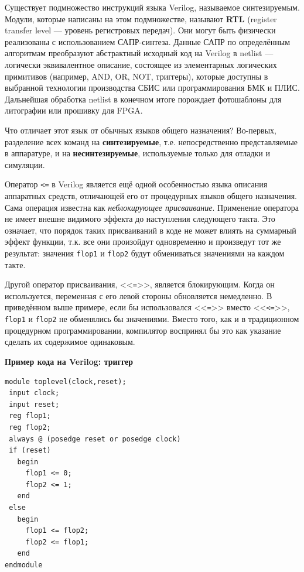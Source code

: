 Существует подмножество инструкций языка Verilog, называемое синтезируемым. Модули, которые написаны на этом подмножестве, называют \textbf{RTL} (\abbr register transfer level --- уровень регистровых передач). Они могут быть физически реализованы с использованием САПР-синтеза. Данные САПР по определённым алгоритмам преобразуют абстрактный исходный код на Verilog в netlist --- логически эквивалентное описание, состоящее из элементарных логических примитивов (например, AND, OR, NOT, триггеры), которые доступны в выбранной технологии производства СБИС или программирования БМК и ПЛИС. Дальнейшая обработка netlist в конечном итоге порождает фотошаблоны для литографии или прошивку для FPGA.

Что отличает этот язык от обычных языков общего назначения? Во-первых, разделение всех команд на \textbf{синтезируемые}, т.е. непосредственно представляемые в аппаратуре, и на \textbf{несинтезируемые}, используемые только для отладки и симуляции.

Оператор \texttt{<=} в Verilog является ещё одной особенностью языка описания аппаратных средств, отличающей его от процедурных языков общего назначения. Сама операция известна как \textit{неблокирующее присваивание}. Применение оператора не имеет внешне видимого эффекта до наступления следующего такта. Это означает, что порядок таких присваиваний в коде не может влиять на суммарный эффект функции, т.к. все они произойдут одновременно и произведут тот же результат: значения \texttt{flop1} и \texttt{flop2} будут обмениваться значениями на каждом такте.

Другой оператор присваивания, <<\texttt{=}>>, является блокирующим. Когда он используется, переменная с его левой стороны обновляется немедленно. В приведённом выше примере, если бы использовался <<\texttt{=}>> вместо <<\texttt{<=}>>, \texttt{flop1} и \texttt{flop2} не обменялись бы значениями. Вместо того, как и в традиционном процедурном программировании, компилятор воспринял бы это как указание сделать их содержимое одинаковым.

\textbf{Пример кода на Verilog: триггер} %

\begin{lstlisting}
module toplevel(clock,reset);
 input clock;
 input reset;
 reg flop1;
 reg flop2;
 always @ (posedge reset or posedge clock)
 if (reset)
   begin
     flop1 <= 0;
     flop2 <= 1;
   end
 else
   begin
     flop1 <= flop2;
     flop2 <= flop1;
   end
endmodule         
\end{lstlisting}

